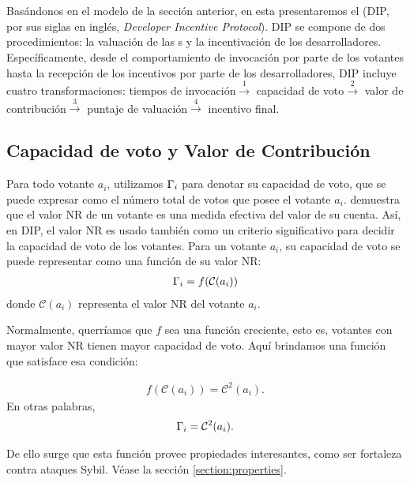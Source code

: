\section{\pidc}
\noindent Basándonos en el modelo de la sección anterior, en esta presentaremos el \pidc (DIP, por sus siglas en inglés, \textit{Developer Incentive Protocol}). DIP se compone de dos procedimientos: la valuación de las {\dapp}s y la incentivación de los desarrolladores. Específicamente, desde el comportamiento de invocación por parte de los votantes hasta la recepción de los incentivos por parte de los desarrolladores, DIP incluye cuatro transformaciones: tiempos de invocación$\overset{1}{\rightarrow}$ capacidad de voto$\overset{2}{\rightarrow}$ valor de contribución$\overset{3}{\rightarrow}$ puntaje de valuación$\overset{4}{\rightarrow}$ incentivo final.

\subsection{Capacidad de voto y Valor de Contribución}
\noindent Para todo votante $a_i$, utilizamos $\Gamma_i$ para denotar su capacidad de voto, que se puede expresar como el número total de votos que posee el votante $a_i$. \cite{Nebulasyellowpaper} demuestra que el valor NR de un votante es una medida efectiva del valor de su cuenta. Así, en DIP, el valor NR es usado también como un criterio significativo para decidir la capacidad de voto de los votantes. Para un votante $a_i$, su capacidad de voto se puede representar como una función de su valor NR:
\begin{align}
	\Gamma_i = f(\mathcal{C}(a_i))
\end{align}
donde $\mathcal{C}(a_i)$ representa el valor NR del votante $a_i$.

Normalmente, querríamos que $f$ sea una función creciente, esto es, votantes con mayor valor NR
tienen mayor capacidad de voto. Aquí brindamos una función que satisface esa condición:

\begin{align}
	\label{eq:capacity}
	f(\mathcal{C}(a_i))=\mathcal{C}^2(a_i).
\end{align}
En otras palabras,
\begin{align}
	\Gamma_i = \mathcal{C}^2(a_i).
\end{align}

De ello surge que esta función provee propiedades interesantes, como ser fortaleza contra ataques Sybil. Véase la sección \ref{section:properties}.

